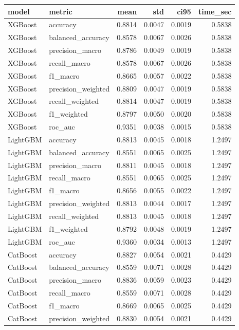 \begin{tabular}{llrrrr}
\toprule
model & metric & mean & std & ci95 & time_sec \\
\midrule
XGBoost & accuracy & 0.8814 & 0.0047 & 0.0019 & 0.5838 \\
XGBoost & balanced_accuracy & 0.8578 & 0.0067 & 0.0026 & 0.5838 \\
XGBoost & precision_macro & 0.8786 & 0.0049 & 0.0019 & 0.5838 \\
XGBoost & recall_macro & 0.8578 & 0.0067 & 0.0026 & 0.5838 \\
XGBoost & f1_macro & 0.8665 & 0.0057 & 0.0022 & 0.5838 \\
XGBoost & precision_weighted & 0.8809 & 0.0047 & 0.0019 & 0.5838 \\
XGBoost & recall_weighted & 0.8814 & 0.0047 & 0.0019 & 0.5838 \\
XGBoost & f1_weighted & 0.8797 & 0.0050 & 0.0020 & 0.5838 \\
XGBoost & roc_auc & 0.9351 & 0.0038 & 0.0015 & 0.5838 \\
LightGBM & accuracy & 0.8813 & 0.0045 & 0.0018 & 1.2497 \\
LightGBM & balanced_accuracy & 0.8551 & 0.0065 & 0.0025 & 1.2497 \\
LightGBM & precision_macro & 0.8811 & 0.0045 & 0.0018 & 1.2497 \\
LightGBM & recall_macro & 0.8551 & 0.0065 & 0.0025 & 1.2497 \\
LightGBM & f1_macro & 0.8656 & 0.0055 & 0.0022 & 1.2497 \\
LightGBM & precision_weighted & 0.8813 & 0.0044 & 0.0017 & 1.2497 \\
LightGBM & recall_weighted & 0.8813 & 0.0045 & 0.0018 & 1.2497 \\
LightGBM & f1_weighted & 0.8792 & 0.0048 & 0.0019 & 1.2497 \\
LightGBM & roc_auc & 0.9360 & 0.0034 & 0.0013 & 1.2497 \\
CatBoost & accuracy & 0.8827 & 0.0054 & 0.0021 & 0.4429 \\
CatBoost & balanced_accuracy & 0.8559 & 0.0071 & 0.0028 & 0.4429 \\
CatBoost & precision_macro & 0.8836 & 0.0059 & 0.0023 & 0.4429 \\
CatBoost & recall_macro & 0.8559 & 0.0071 & 0.0028 & 0.4429 \\
CatBoost & f1_macro & 0.8669 & 0.0065 & 0.0025 & 0.4429 \\
CatBoost & precision_weighted & 0.8830 & 0.0054 & 0.0021 & 0.4429 \\

\end{tabular}
